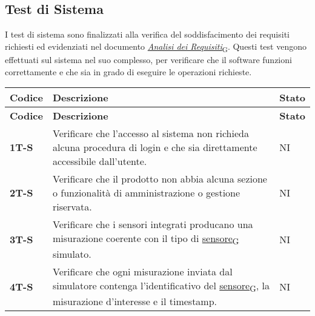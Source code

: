 \subsection{Test di Sistema}
I test di sistema sono finalizzati alla verifica del soddisfacimento dei requisiti richiesti ed evidenziati nel documento \href{https://7last.github.io/docs/rtb/documentazione-esterna/analisi-dei-requisiti}{\href{https://7last.github.io/docs/rtb/documentazione-interna/glossario\#analisi-dei-requisiti}{\textit{Analisi dei Requisiti}\textsubscript{G}}}. Questi test vengono effettuati sul sistema nel suo complesso, per verificare che il software funzioni correttamente e che sia in grado di eseguire le operazioni richieste. \\
\begin{longtable}{|>{\raggedright\arraybackslash}m{}|>{\raggedright\arraybackslash}m{}|>{\raggedright\arraybackslash}m{}|}
	\hline
	\textbf{Codice} & \textbf{Descrizione}                                                                                                                                                               & \textbf{Stato} \\
	\hline
	\endfirsthead
	\hline
	\textbf{Codice} & \textbf{Descrizione}                                                                                                                                                               & \textbf{Stato} \\
	\endhead
	\textbf{1T-S}   & Verificare che l'accesso al sistema non richieda alcuna procedura di login e che sia direttamente accessibile dall'utente.                                                         & NI             \\
	\hline
	\textbf{2T-S}   & Verificare che il prodotto non abbia alcuna sezione o funzionalità di amministrazione o gestione riservata.                                                                        & NI             \\
	\hline
	\textbf{3T-S}   & Verificare che i sensori integrati producano una misurazione coerente con il tipo di \href{https://7last.github.io/docs/rtb/documentazione-interna/glossario\#sensore}{sensore\textsubscript{G}} simulato.                                                                             & NI             \\
	\hline
	\textbf{4T-S}   & Verificare che ogni misurazione inviata dal simulatore contenga l’identificativo del \href{https://7last.github.io/docs/rtb/documentazione-interna/glossario\#sensore}{sensore\textsubscript{G}}, la misurazione d'interesse e il timestamp.                                           & NI             \\

\end{longtable}
